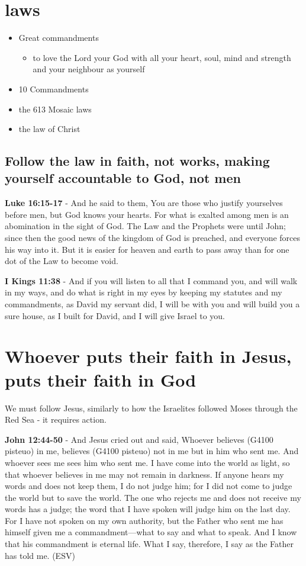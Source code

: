 \documentclass[11pt]{article}
\begin{document}
\section{laws}
\label{sec:org94fd230}
\begin{itemize}
\item Great commandments
\begin{itemize}
\item to love the Lord your God with all your heart, soul, mind and strength and your neighbour as yourself
\end{itemize}
\item 10 Commandments
\item the 613 Mosaic laws
\item the law of Christ
\end{itemize}

\subsection{Follow the law in faith, not works, making yourself accountable to God, not men}
\label{sec:orga037ee4}
\textbf{Luke 16:15-17} - And he said to them, You are those who justify yourselves before men, but God knows your hearts. For what is exalted among men is an abomination in the sight of God.  The Law and the Prophets were until John; since then the good news of the kingdom of God is preached, and everyone forces his way into it.  But it is easier for heaven and earth to pass away than for one dot of the Law to become void.

\textbf{I Kings 11:38} - And if you will listen to all that I command you, and will walk in my ways, and do what is right in my eyes by keeping my statutes and my commandments, as David my servant did, I will be with you and will build you a sure house, as I built for David, and I will give Israel to you.

\section{Whoever puts their faith in Jesus, puts their faith in God}
\label{sec:orgb3d14e6}
We must follow Jesus, similarly to how the Israelites followed Moses through the Red Sea - it requires action.

\textbf{John 12:44-50} - And Jesus cried out and said, Whoever believes (G4100 pisteuo) in me, believes (G4100 pisteuo) not in me but in him who sent me.  And whoever sees me sees him who sent me.  I have come into the world as light, so that whoever believes in me may not remain in darkness.  If anyone hears my words and does not keep them, I do not judge him; for I did not come to judge the world but to save the world.  The one who rejects me and does not receive my words has a judge; the word that I have spoken will judge him on the last day.  For I have not spoken on my own authority, but the Father who sent me has himself given me a commandment—what to say and what to speak.  And I know that his commandment is eternal life.  What I say, therefore, I say as the Father has told me. (ESV)
\end{document}
